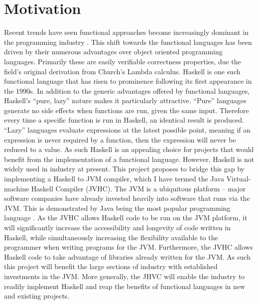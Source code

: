 \documentclass[float=false, crop=false]{standalone}
\begin{document}
\section{Motivation}

Recent trends have seen functional approaches become increasingly dominant in the programming industry 
\cite{fp-trends}. This shift towards the functional languages has been driven by their numerous advantages over object oriented programming languages.  Primarily these are easily verifiable correctness properties, due the field's original derivation from Church's Lambda calculus.  Haskell is one such functional language that has risen to prominence following its first appearance in the 1990s. In addition to the generic
advantages offered by functional languages, Haskell’s ``pure, lazy'' nature makes it particularly attractive. ``Pure'' languages generate no side effects when functions are run, given the same input. 
Therefore every time a specific function is run in Haskell, an identical result is produced. ``Lazy'' languages evaluate expressions at the latest possible point, meaning if an expression is never required by a function, then the expression will never be reduced to a value. As such Haskell is an appealing choice for
projects that would benefit from the implementation of a functional language. However, Haskell is not widely used in industry at present. This project proposes to bridge this gap by implementing a Haskell to JVM compiler, which I have termed the Java Virtual-machine Haskell Compiler (JVHC). The JVM is a ubiquitous platform -- major software companies have already invested heavily into software that runs via the JVM. 
This is demonstrated by Java being the most popular programming language \cite{JVM-adoption}. 
As the JVHC allows Haskell code to be run on the JVM platform, it will significantly increase the accessibility and
longevity of code written in Haskell, while simultaneously increasing the flexibility available to the programmer 
when writing programs for the JVM. 
Furthermore, the JVHC allows Haskell code to take advantage of libraries already written for the JVM. 
As such this project will benefit the large sections of industry with established investments in the JVM. More generally, the JHVC will enable the industry to readily implement Haskell and reap the benefits of functional languages in new and existing projects.


\end{document}
